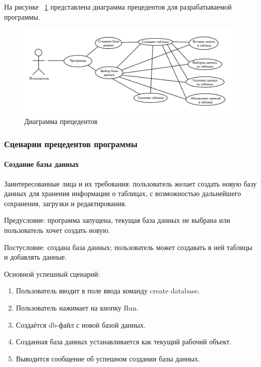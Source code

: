 На рисунке ~\ref{fig:prec} представлена диаграмма прецедентов для разрабатываемой программы.

\begin{figure}[H]
	\centering
	\includegraphics[width=1\linewidth]{images/prec}
	\caption{Диаграмма прецедентов}
	\label{fig:prec}
\end{figure}

\subsubsection{Сценарии прецедентов программы}

\paragraph{Создание базы данных}

Заинтересованные лица и их требования: пользователь желает создать новую базу данных для хранения информации о таблицах, с возможностью дальнейшего сохранения, загрузки и редактирования.

Предусловие: программа запущена, текущая база данных не выбрана или пользователь хочет создать новую.

Постусловие: создана база данных; пользователь может создавать в ней таблицы и добавлять данные.

Основной успешный сценарий:
\begin{enumerate}
	\item Пользователь вводит в поле ввода команду create database.	
	\item Пользователь нажимает на кнопку Run.			
	\item Создаётся db-файл с новой базой данных.	
	\item Созданная база данных устанавливается как текущий рабочий объект.
	\item Выводится сообщение об успешном создании базы данных.	
\end{enumerate}

